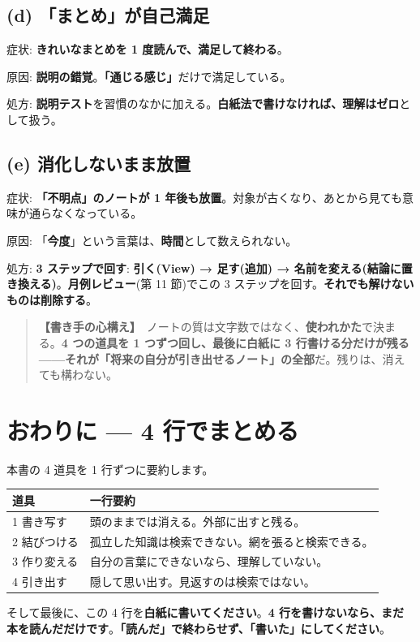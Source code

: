 \documentclass{article}
\begin{document}
\subsection{(d) 「まとめ」が自己満足}

症状: \textbf{きれいなまとめを 1 度読んで、満足して終わる}。

原因: \textbf{説明の錯覚}。\textbf{「通じる感じ」}だけで満足している。

処方: \textbf{説明テスト}を習慣のなかに加える。\textbf{白紙法で書けなければ、理解はゼロ}として扱う。

\subsection{(e) 消化しないまま放置}

症状: \textbf{「不明点」のノートが 1 年後も放置}。対象が古くなり、あとから見ても意味が通らなくなっている。

原因: 「\textbf{今度}」という言葉は、\textbf{時間}として数えられない。

処方: \textbf{3 ステップで回す}: \textbf{引く(View) → 足す(追加) → 名前を変える(結論に置き換える)}。\textbf{月例レビュー}(第 11 節)でこの 3 ステップを回す。\textbf{それでも解けないものは削除する}。

\begin{quote}
\textbf{【書き手の心構え】}\ ノートの質は文字数ではなく、\textbf{使われかた}で決まる。\textbf{4 つの道具を 1 つずつ回し、最後に白紙に 3 行書ける分だけが残る——それが「将来の自分が引き出せるノート」の全部}だ。残りは、消えても構わない。
\end{quote}

\section{おわりに — 4 行でまとめる}

本書の 4 道具を 1 行ずつに要約します。

\begin{center}
\begin{tabular}{|l|l|}
\hline
道具 & 一行要約 \\
\hline
1 書き写す & 頭のままでは消える。外部に出すと残る。 \\
\hline
2 結びつける & 孤立した知識は検索できない。網を張ると検索できる。 \\
\hline
3 作り変える & 自分の言葉にできないなら、理解していない。 \\
\hline
4 引き出す & 隠して思い出す。見返すのは検索ではない。 \\
\hline
\end{tabular}
\end{center}

そして最後に、この 4 行を\textbf{白紙に書いてください}。\textbf{4 行を書けないなら、まだ本を読んだだけです}。\textbf{「読んだ」で終わらせず、「書いた」にしてください}。
\end{document}
